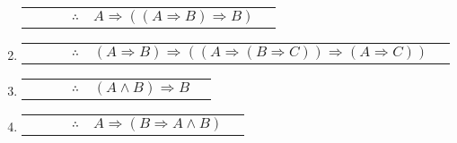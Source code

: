 \documentclass[12pt]{report}
\newcounter{it}
\theoremstyle{largebreak}
\newcounter{tablec}
\begin{document}
\begin{sol}
\begin{enumerate}
\begin{center}
                \setcounter{tablec}{1}
                \begin{tabular}{l r l c l r}
                    \hline
                    & & & $\therefore$ & $A\Rightarrow ((A\Rightarrow B)\Rightarrow B)$ & \\
                \end{tabular}
            \end{center}
            \item
            \begin{center}
                \begin{tabular}{l r l c l r}
                    \hline
                    & & & $\therefore$ & $(A\Rightarrow B)\Rightarrow((A\Rightarrow (B\Rightarrow C))\Rightarrow(A\Rightarrow C))$ & \\
                \end{tabular}
            \end{center}
            \item
            \begin{center}
                \setcounter{tablec}{1}
                \begin{tabular}{l r l c l r}
                    \hline
                    & & & $\therefore$ & $(A\land B)\Rightarrow B$ & \\
                \end{tabular}
            \end{center}
            \item
            \begin{center}
                \setcounter{tablec}{1}
                \begin{tabular}{l r l c l r}
                    \hline
                    & & & $\therefore$ & $A\Rightarrow(B\Rightarrow A\land B)$ & \\
                \end{tabular}
            \end{center}
        \end{enumerate}
    \end{sol}
\end{document}
